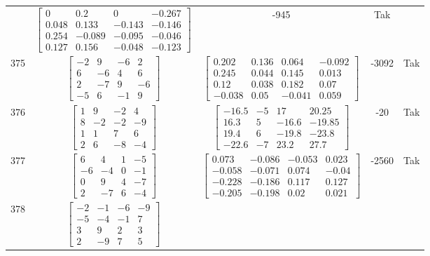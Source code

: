 \documentclass[a4paper,12pt]{article}
\begin{document}
\begin{tabular}{c c c c c}
&
$\begin{bmatrix} 0 & 0.2 & 0 & -0.267 \\ 0.048 & 0.133 & -0.143 & -0.146 \\ 0.254 & -0.089 & -0.095 & -0.046 \\ 0.127 & 0.156 & -0.048 & -0.123 \end{bmatrix}$
&
-945
&
Tak
\\
375
&
$\begin{bmatrix} -2 & 9 & -6 & 2 \\ 6 & -6 & 4 & 6 \\ 2 & -7 & 9 & -6 \\ -5 & 6 & -1 & 9 \end{bmatrix}$
&
$\begin{bmatrix} 0.202 & 0.136 & 0.064 & -0.092 \\ 0.245 & 0.044 & 0.145 & 0.013 \\ 0.12 & 0.038 & 0.182 & 0.07 \\ -0.038 & 0.05 & -0.041 & 0.059 \end{bmatrix}$
&
-3092
&
Tak
\\
376
&
$\begin{bmatrix} 1 & 9 & -2 & 4 \\ 8 & -2 & -2 & -9 \\ 1 & 1 & 7 & 6 \\ 2 & 6 & -8 & -4 \end{bmatrix}$
&
$\begin{bmatrix} -16.5 & -5 & 17 & 20.25 \\ 16.3 & 5 & -16.6 & -19.85 \\ 19.4 & 6 & -19.8 & -23.8 \\ -22.6 & -7 & 23.2 & 27.7 \end{bmatrix}$
&
-20
&
Tak
\\
377
&
$\begin{bmatrix} 6 & 4 & 1 & -5 \\ -6 & -4 & 0 & -1 \\ 0 & 9 & 4 & -7 \\ 2 & -7 & 6 & -4 \end{bmatrix}$
&
$\begin{bmatrix} 0.073 & -0.086 & -0.053 & 0.023 \\ -0.058 & -0.071 & 0.074 & -0.04 \\ -0.228 & -0.186 & 0.117 & 0.127 \\ -0.205 & -0.198 & 0.02 & 0.021 \end{bmatrix}$
&
-2560
&
Tak
\\
378
&
$\begin{bmatrix} -2 & -1 & -6 & -9 \\ -5 & -4 & -1 & 7 \\ 3 & 9 & 2 & 3 \\ 2 & -9 & 7 & 5 \end{bmatrix}$

\end{tabular}
\end{document}
